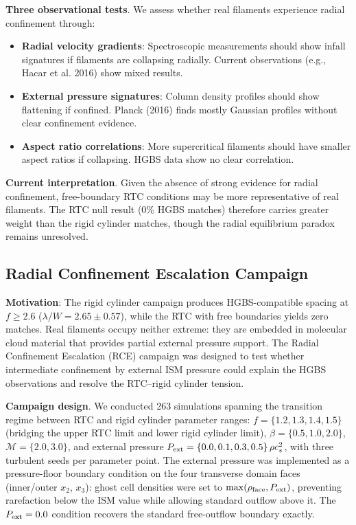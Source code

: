 \documentclass[twocolumn,usenatbib]{mnras}
\begin{document}
\noindent\textbf{Three observational tests}. We assess whether real filaments experience radial confinement through:
\begin{itemize}
\item \textbf{Radial velocity gradients}: Spectroscopic measurements should show infall signatures if filaments are collapsing radially. Current observations (e.g., Hacar et al. 2016) show mixed results.
\item \textbf{External pressure signatures}: Column density profiles should show flattening if confined. Planck (2016) finds mostly Gaussian profiles without clear confinement evidence.
\item \textbf{Aspect ratio correlations}: More supercritical filaments should have smaller aspect ratios if collapsing. HGBS data show no clear correlation.
\end{itemize}

\noindent\textbf{Current interpretation}. Given the absence of strong evidence for radial confinement, free-boundary RTC conditions may be more representative of real filaments. The RTC null result (0\% HGBS matches) therefore carries greater weight than the rigid cylinder matches, though the radial equilibrium paradox remains unresolved.

\subsection{Radial Confinement Escalation Campaign}
\label{sec:rce}

\textbf{Motivation}: The rigid cylinder campaign produces HGBS-compatible spacing at $f \geq 2.6$ ($\lambda/W = 2.65 \pm 0.57$), while the RTC with free boundaries yields zero matches. Real filaments occupy neither extreme: they are embedded in molecular cloud material that provides partial external pressure support. The Radial Confinement Escalation (RCE) campaign was designed to test whether intermediate confinement by external ISM pressure could explain the HGBS observations and resolve the RTC--rigid cylinder tension.

\textbf{Campaign design}. We conducted 263 simulations spanning the transition regime between RTC and rigid cylinder parameter ranges: $f = \{1.2, 1.3, 1.4, 1.5\}$ (bridging the upper RTC limit and lower rigid cylinder limit), $\beta = \{0.5, 1.0, 2.0\}$, $\mathcal{M} = \{2.0, 3.0\}$, and external pressure $P_{\rm ext} = \{0.0, 0.1, 0.3, 0.5\}\,\rho c_s^2$, with three turbulent seeds per parameter point. The external pressure was implemented as a pressure-floor boundary condition on the four transverse domain faces (inner/outer $x_2$, $x_3$): ghost cell densities were set to $\max(\rho_{\rm face}, P_{\rm ext})$, preventing rarefaction below the ISM value while allowing standard outflow above it. The $P_{\rm ext} = 0.0$ condition recovers the standard free-outflow boundary exactly.
\end{document}
